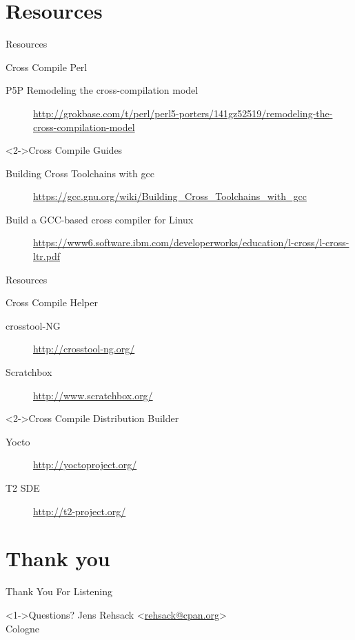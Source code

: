 \documentclass[ngerman,xcolor={table,dvipsnames},smaller,compress,hyperref={bookmarks,colorlinks}]{beamer}%
\begin{document}
\section{Resources}

\begin{frame}[fragile]{Resources}
\begin{block}{Cross Compile Perl}
\begin{description}
\item[\lbrack{}P5P\rbrack{} Remodeling the cross-compilation model] \url{http://grokbase.com/t/perl/perl5-porters/141gz52519/remodeling-the-cross-compilation-model}
\end{description}
\end{block}
\begin{block}<2->{Cross Compile Guides}
\begin{description}
\item[Building Cross Toolchains with gcc] \url{https://gcc.gnu.org/wiki/Building_Cross_Toolchains_with_gcc}
\item[Build a GCC-based cross compiler for Linux] \url{https://www6.software.ibm.com/developerworks/education/l-cross/l-cross-ltr.pdf}
\end{description}
\end{block}
\end{frame}

\begin{frame}[fragile]{Resources}
\begin{block}{Cross Compile Helper}
\begin{description}
\item[crosstool-NG] \url{http://crosstool-ng.org/}
\item[Scratchbox] \url{http://www.scratchbox.org/}
\end{description}
\end{block}
\begin{block}<2->{Cross Compile Distribution Builder}
\begin{description}
\item[Yocto] \url{http://yoctoproject.org/}
\item[T2 SDE] \url{http://t2-project.org/}
\end{description}
\end{block}
\end{frame}

\section{Thank you}

\begin{frame}[fragile]{Thank You For Listening}
\begin{block}<1->{Questions?}
Jens Rehsack \textless{}\href{mailto:rehsack@cpan.org}{rehsack@cpan.org}\textgreater{} \\
Cologne
\end{block}
\end{frame}
\end{document}
